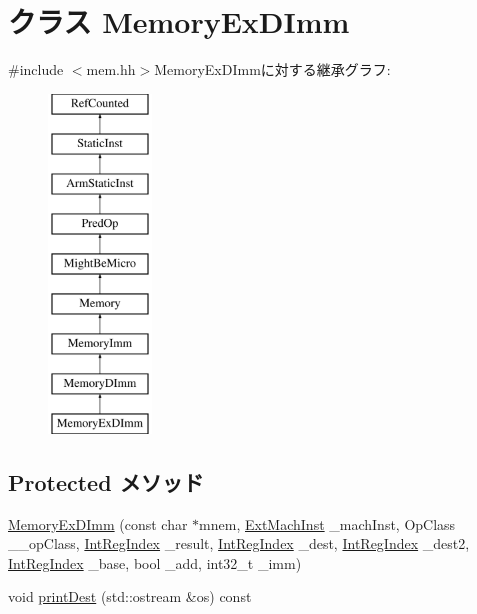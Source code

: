 \hypertarget{classArmISA_1_1MemoryExDImm}{
\section{クラス MemoryExDImm}
\label{classArmISA_1_1MemoryExDImm}
}


{\ttfamily \#include $<$mem.hh$>$}MemoryExDImmに対する継承グラフ:\begin{figure}[H]
\begin{center}
\leavevmode
\includegraphics[height=9cm]{classArmISA_1_1MemoryExDImm}
\end{center}
\end{figure}
\subsection*{Protected メソッド}
\begin{DoxyCompactItemize}
\item 
\hyperlink{classArmISA_1_1MemoryExDImm_a057471464ba49b260b6c0950550ffe1a}{MemoryExDImm} (const char $\ast$mnem, \hyperlink{classStaticInst_a5605d4fc727eae9e595325c90c0ec108}{ExtMachInst} \_\-machInst, OpClass \_\-\_\-opClass, \hyperlink{namespaceArmISA_ae64680ba9fb526106829d6bf92fc791b}{IntRegIndex} \_\-result, \hyperlink{namespaceArmISA_ae64680ba9fb526106829d6bf92fc791b}{IntRegIndex} \_\-dest, \hyperlink{namespaceArmISA_ae64680ba9fb526106829d6bf92fc791b}{IntRegIndex} \_\-dest2, \hyperlink{namespaceArmISA_ae64680ba9fb526106829d6bf92fc791b}{IntRegIndex} \_\-base, bool \_\-add, int32\_\-t \_\-imm)
\item 
void \hyperlink{classArmISA_1_1MemoryExDImm_adee5df6e5d6b0c498363aabda42431fa}{printDest} (std::ostream \&os) const 
\end{DoxyCompactItemize}
